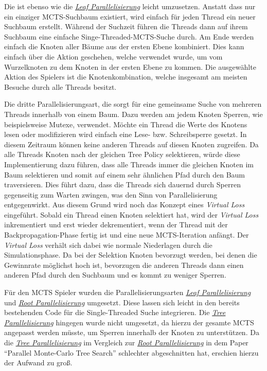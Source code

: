 \pagebreak

Die  ist ebenso wie die \hyperref[text:leaf-parallelization]{\emph{Leaf Parallelisierung}} leicht umzusetzen. Anstatt dass nur ein einziger \ac{MCTS}-Suchbaum existiert, wird einfach für jeden Thread ein neuer Suchbaum erstellt. Während der Suchzeit führen die Threads dann auf ihrem Suchbaum eine einfache Singe-Threaded-\ac{MCTS}-Suche durch. Am Ende werden einfach die Knoten aller Bäume aus der ersten Ebene kombiniert. Dies kann einfach über die Aktion geschehen, welche verwendet wurde, um vom Wurzelknoten zu dem Knoten in der ersten Ebene zu kommen. Die ausgewählte Aktion des Spielers ist die Knotenkombination, welche insgesamt am meisten Besuche durch alle Threads besitzt. \cite[S. 63]{2008.ParallelMCTS}

Die dritte Parallelisierungsart, die  sorgt für eine gemeinsame Suche von mehreren Threads innerhalb von einem Baum. Dazu werden am jedem Knoten Sperren, wie beispielsweise Mutexe, verwendet. Möchte ein Thread die Werte des Knotens lesen oder modifizieren wird einfach eine Lese- bzw. Schreibsperre gesetzt. In diesem Zeitraum können keine anderen Threads auf diesen Knoten zugreifen. Da alle Threads Knoten nach der gleichen Tree Policy selektieren, würde diese Implementierung dazu führen, dass alle Threads immer die gleichen Knoten im Baum selektieren und somit auf einem sehr ähnlichen Pfad durch den Baum traversieren. Dies führt dazu, dass die Threads sich dauernd durch Sperren gegenseitig zum Warten zwingen, was den Sinn von Parallelisierung entgegenwirkt. Aus diesem Grund wird noch das Konzept eines \emph{Virtual Loss} eingeführt. Sobald ein Thread einen Knoten selektiert hat, wird der \emph{Virtual Loss} inkrementiert und erst wieder dekrementiert, wenn der Thread mit der Backpropagation-Phase fertig ist und eine neue \ac{MCTS}-Iteration anfängt. Der \emph{Virtual Loss} verhält sich dabei wie normale Niederlagen durch die Simulationsphase. Da bei der Selektion Knoten bevorzugt werden, bei denen die Gewinnrate möglichst hoch ist, bevorzugen die anderen Threads dann einen anderen Pfad durch den Suchbaum und es kommt zu weniger Sperren. \cite[S. 64]{2008.ParallelMCTS}

Für den \ac{MCTS} Spieler wurden die Parallelisierungsarten \hyperref[text:leaf-parallelization]{\emph{Leaf Parallelisierung}} und \hyperref[text:root-parallelization]{\emph{Root Parallelisierung}} umgesetzt. Diese lassen sich leicht in den bereits bestehenden Code für die Single-Threaded Suche integrieren. Die \hyperref[text:tree-parallelization]{\emph{Tree Parallelisierung}} hingegen wurde nicht umgesetzt, da hierzu der gesamte \ac{MCTS} angepasst werden müsste, um Sperren innerhalb der Knoten zu unterstützen. Da die \hyperref[text:tree-parallelization]{\emph{Tree Parallelisierung}} im Vergleich zur \hyperref[text:root-parallelization]{\emph{Root Parallelisierung}} in dem Paper \enquote{Parallel Monte-Carlo Tree Search} \cite[S. 69]{2008.ParallelMCTS} schlechter abgeschnitten hat, erschien hierzu der Aufwand zu groß.

